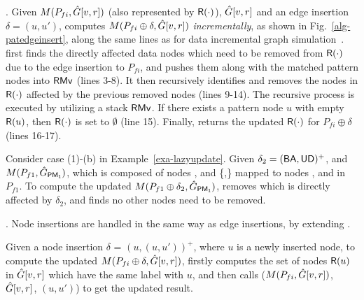 .
Given $M(P_{fi}, \hat{G}{[v,r]})$ (also represented by ${\mathsf{R}}(\cdot)$), $\hat{G}{[v,r]}$ and an edge insertion $\delta=(u,u')$, \patedgeinsert computes $M(P_{fi}\oplus\delta, \hat{G}{[v,r]})$ {\em incrementally}, as shown in Fig.~\ref{alg-patedgeinsert},
along the same lines as for data incremental graph simulation~\cite{FanWW13-tods}.
\patedgeinsert first finds the directly affected data nodes which need to be removed from ${\mathsf{R}}(\cdot)$ due to the edge insertion to $P_{fi}$,
and pushes them along with the matched pattern nodes into ${\mathsf{RMv}}$ (lines 3-8).
It then recursively identifies and removes the nodes in ${\mathsf{R}}(\cdot)$ affected by the previous removed nodes (lines 9-14).
The recursive process is executed by utilizing a stack ${\mathsf{RMv}}$.
If there exists a pattern node $u$ with empty ${\mathsf{R}}(u)$, then ${\mathsf{R}}(\cdot)$ is set to $\emptyset$ (line 15).
Finally, \patedgeinsert returns the updated ${\mathsf{R}}(\cdot)$ for $P_{fi}\oplus \delta$ (lines 16-17).


\begin{example}
\label{exa-edge-insertion}
Consider case (1)-(b) in Example~\ref{exa-lazyupdate}.
Given $\delta_2 = ({\mathsf{BA}},{\mathsf{UD}})^+$, and $M(P_{f1}, \hat{G}{}_{{\mathsf{PM_1}}})$, which is composed of nodes ,  and \{,\} mapped to nodes ,  and  in $P_{f1}$.
To compute the updated $M(P_{f1}\oplus \delta_2, \hat{G}{}_{{\mathsf{PM_1}}})$,
\patedgeinsert removes  which is directly affected by $\delta_2$, and finds no other nodes need to be removed.
\end{example}



. 
Node insertions are handled in the same way as edge insertions, by extending \patedgeinsert.

Given a node insertion $\delta$ = $(u,(u,u'))^+$, where $u$ is a newly inserted node,
to compute the updated $M(P_{fi}\oplus \delta, \hat{G}{[v,r]})$,
\incmatch firstly computes the set of nodes ${\mathsf{R}}(u)$ in $\hat{G}{[v,r]}$ which have the same label with $u$, and then calls \patedgeinsert($M(P_{fi}, \hat{G}{[v,r]})$, $\hat{G}{[v,r]}$, $(u,u')$) to get the updated result.

